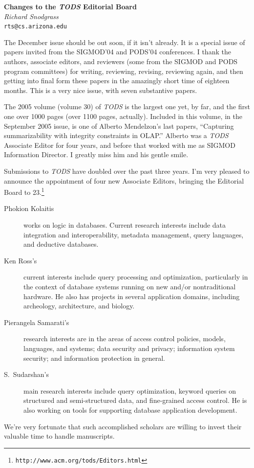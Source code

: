 \documentclass{article}[11pt]
\begin{document}
\begin{center}
{\Large\bf Changes to the {\em TODS} Editorial Board}\\[2ex]
{\large\it  Richard Snodgrass}\\[1ex]
{\tt rts@cs.arizona.edu}\\[3ex]
\end{center}

The December issue should be out soon, if it isn't already. It is a special
issue of papers invited from the SIGMOD'04 and PODS'04 conferences. I thank
the authors, associate editors, and reviewers (some from the SIGMOD and PODS
program committees) for writing, reviewing, revising, reviewing again, and
then getting into final form these papers in the amazingly short time of
eighteen months. This is a very nice issue, with seven substantive papers.

The 2005 volume (volume 30) of {\em TODS} is the largest one yet, by far,
and the first one over 1000 pages (over 1100 pages, actually). Included in
this volume, in the September 2005 issue, is one of Alberto Mendelzon's last
papers, ``Capturing summarizability with integrity constraints in OLAP.''
Alberto was a {\em TODS} Associate Editor for four years, and before that
worked with me as SIGMOD Information Director. I greatly miss him and his
gentle smile.

Submissions to {\em TODS} have doubled over the past three years. I'm very
pleased to announce the appointment of four new Associate Editors, bringing
the Editorial Board to 23.\footnote{\tt http://www.acm.org/tods/Editors.html}

\begin{description}
\item[Phokion Kolaitis] works on logic in databases. Current research 
interests
include data integration and interoperability, metadata management, query 
languages, and deductive databases.

\item[Ken Ross's] current interests include query processing and optimization,
particularly in the context of database systems running on new
and/or nontraditional hardware.  He also has projects in several
application domains, including archeology, architecture, and biology.

\item[Pierangela Samarati's] research interests are in the areas of access
control policies, models, languages, and systems; data security and privacy;
information system security; and information protection in general.

\item[S.~Sudarshan's] main research interests include query optimization, 
keyword queries on structured and semi-structured data, and 
fine-grained access control.  He is also working on tools for
supporting database application development. 
\end{description}

\noindent
We're very fortunate that such accomplished scholars are willing to invest
their valuable time to handle manuscripts.
\end{document}
